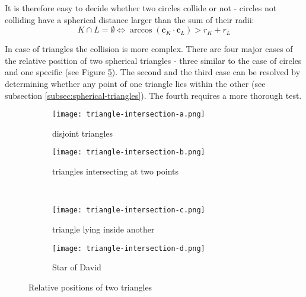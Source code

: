 It is therefore easy to decide whether two circles collide or not - circles not colliding have a spherical distance larger than the sum of their radii:
$$K \cap L = \emptyset \Longleftrightarrow \arccos(\mathbf{c}_K\cdot\mathbf{c}_L)>r_K+r_L$$

In case of triangles the collision is more complex. There are four major cases of the relative position of two spherical triangles - three  similar to the case of circles and one specific (see Figure \ref{fig:triangle-collisions}). The second and the third case can be resolved by determining whether any point of one triangle lies within the other (see subsection \ref{subsec:spherical-triangles}). The fourth requires a more thorough test.

\begin{figure}[ht]
\centering
\begin{subfigure}{7cm}
\texttt{[image: triangle-intersection-a.png]}
\caption{disjoint triangles}
\label{fig:disjoint-triangles}
\end{subfigure}
\hspace*{1cm}
\begin{subfigure}{7cm}
\texttt{[image: triangle-intersection-b.png]}
\caption{triangles intersecting at two points}
\label{fig:triangles-intersecting-at-two-points}
\end{subfigure}\\
\begin{subfigure}{7cm}
\texttt{[image: triangle-intersection-c.png]}
\caption{triangle lying inside another}
\label{fig:triangle-lying-inside-another}
\end{subfigure}
\hspace*{1cm}
\begin{subfigure}{7cm}
\texttt{[image: triangle-intersection-d.png]}
\caption{Star of David}
\label{fig:star-of-david}
\end{subfigure}
\caption{Relative positions of two triangles}
\label{fig:triangle-collisions}
\end{figure}

